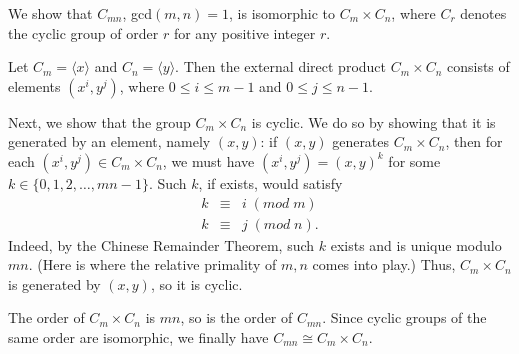 \documentclass[12pt]{article}
\begin{document}
We show that $C_{mn}$, gcd$(m, n)=1$, is isomorphic to $C_m\times C_n$, where $C_r$ denotes the cyclic group of order $r$ for any positive integer $r$.

Let $C_m=\langle x\rangle$ and $C_n=\langle y\rangle$. Then the external direct product $C_m\times C_n$ consists of elements $(x^i, y^j)$, where $0\leq i\leq m-1$ and $0\leq j\leq n-1$.

Next, we show that the group $C_m\times C_n$ is cyclic. We do so by showing that it is generated by an element, namely $(x, y)$:
if $(x, y)$ generates $C_m\times C_n$, then for each $(x^i, y^j)\in C_m\times C_n$, we must have $(x^i, y^j)=(x, y)^k$ for some $k\in\{0, 1, 2, \ldots, mn-1\}$. Such $k$, if exists, would satisfy
\begin{eqnarray*}
k &\equiv& i\;(mod\;m) \\
k &\equiv& j\;(mod\;n).
\end{eqnarray*}
Indeed, by the Chinese Remainder Theorem, such $k$ exists and is unique modulo $mn$. (Here is where the relative primality of $m, n$ comes into play.) Thus, $C_m\times C_n$ is generated by $(x, y)$, so it is cyclic.

The order of $C_m\times C_n$ is $mn$, so is the order of $C_{mn}$. Since cyclic groups of the same order are isomorphic, we finally have $C_{mn}\cong C_m\times C_n$.
\end{document}
